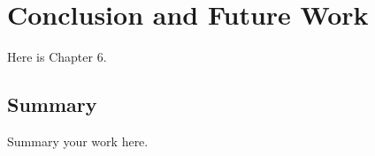 \documentclass[../main/thesis.tex]{subfiles}
\begin{document}
\chapter{Conclusion and Future Work}
\label{ch:6}
Here is Chapter 6. 


\section{Summary}
Summary your work here.

\bib
\end{document}

